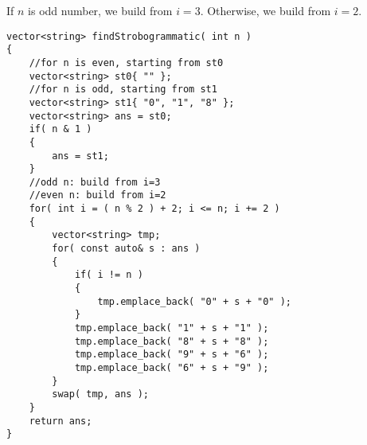 If $n$ is odd number, we build from $i=3$. Otherwise, we build from $i=2$.

\setcounter{lstlisting}{0}
\begin{lstlisting}[style=customc, caption={Iterative}]
vector<string> findStrobogrammatic( int n )
{
    //for n is even, starting from st0
    vector<string> st0{ "" };
    //for n is odd, starting from st1
    vector<string> st1{ "0", "1", "8" };
    vector<string> ans = st0;
    if( n & 1 )
    {
        ans = st1;
    }
    //odd n: build from i=3
    //even n: build from i=2
    for( int i = ( n % 2 ) + 2; i <= n; i += 2 )
    {
        vector<string> tmp;
        for( const auto& s : ans )
        {
            if( i != n )
            {
                tmp.emplace_back( "0" + s + "0" );
            }
            tmp.emplace_back( "1" + s + "1" );
            tmp.emplace_back( "8" + s + "8" );
            tmp.emplace_back( "9" + s + "6" );
            tmp.emplace_back( "6" + s + "9" );
        }
        swap( tmp, ans );
    }
    return ans;
}
\end{lstlisting}